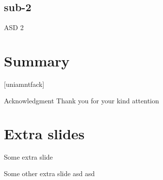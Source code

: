 \documentclass[aspectratio=169]{beamer}
\begin{document}
\subsection{sub-2}
\begin{frame}{ASD 2}
\end{frame}

\section{Summary}

{
    [uniamntfack] %
    \begin{frame}[plain]{Acknowledgment}
        Thank you for your kind attention
    \end{frame}
}

\section*{Extra slides} %
\begin{frame}[noframenumbering]{Some extra slide}
\end{frame}
{
    \begin{frame}[noframenumbering]{Some other extra slide}
        asd asd
    \end{frame}
}
\end{document}
